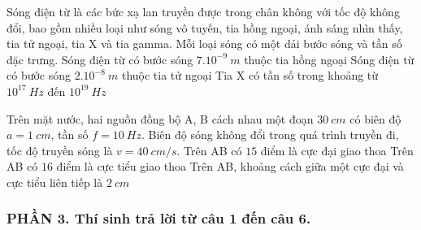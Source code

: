 \begin{ex}
	Sóng điện từ là các bức xạ lan truyền được trong chân không với tốc độ không đổi, bao gồm nhiều loại như sóng vô tuyến, tia hồng ngoại, ánh sáng nhìn thấy, tia tử ngoại, tia X và tia gamma. Mỗi loại sóng có một dải bước sóng và tần số đặc trưng. 
	{Sóng điện từ có bước sóng $7.10^{-9}\ m$ thuộc tia hồng ngoại}
	{\True Sóng điện từ có bước sóng $2.10^{-8}\ m$ thuộc tia tử ngoại}
	{\True Tia X có tần số trong khoảng từ $10^{17}\ Hz$ đến $10^{19}\ Hz$}
\end{ex}
\begin{ex}
	Trên mặt nước, hai nguồn đồng bộ A, B cách nhau một đoạn $30 \ cm$ có biên độ $a=1 \ cm$, tần số $f=10 \ Hz$. Biên độ sóng không đổi trong quá trình truyền đi, tốc độ truyền sóng là $v=40 \ cm/s$.
	{\True Trên AB có $15$ điểm là cực đại giao thoa}
	{Trên AB có $16$ điểm là cực tiểu giao thoa}
	{Trên AB, khoảng cách giữa một cực đại và cực tiểu liên tiếp là $2\ cm$}
\end{ex}
\subsubsection*{PHẦN 3. Thí sinh trả lời từ câu 1 đến câu 6.}
\setcounter{ex}{0}

